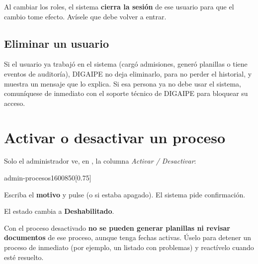 \begin{nota}
Al cambiar los roles, el sistema \textbf{cierra la sesión} de ese usuario para que el cambio
tome efecto. Avísele que debe volver a entrar.
\end{nota}

\subsection{Eliminar un usuario}

\begin{pasos}
\end{pasos}

\begin{importante}
Si el usuario ya trabajó en el sistema (cargó admisiones, generó planillas o tiene eventos de
auditoría), DIGAIPE no deja eliminarlo, para no perder el historial, y muestra un mensaje que lo
explica. Si esa persona ya no debe usar el sistema, comuníquese de inmediato con el soporte
técnico de DIGAIPE para bloquear su acceso.
\end{importante}

\section{Activar o desactivar un proceso}

Solo el administrador ve, en , la columna
\emph{Activar / Desactivar}:

\begin{captura}{admin-procesos}{1600}{850}[0.75\linewidth]
\end{captura}

\begin{leyenda}
  \item[1] Escriba el \textbf{motivo} y pulse  (o  si estaba
        apagado). El sistema pide confirmación.
  \item[2] El estado cambia a \textbf{Deshabilitado}.
\end{leyenda}

\begin{importante}
Con el proceso desactivado \textbf{no se pueden generar planillas ni revisar documentos} de ese
proceso, aunque tenga fechas activas. Úselo para detener un proceso de inmediato (por ejemplo,
un listado con problemas) y reactívelo cuando esté resuelto.
\end{importante}

